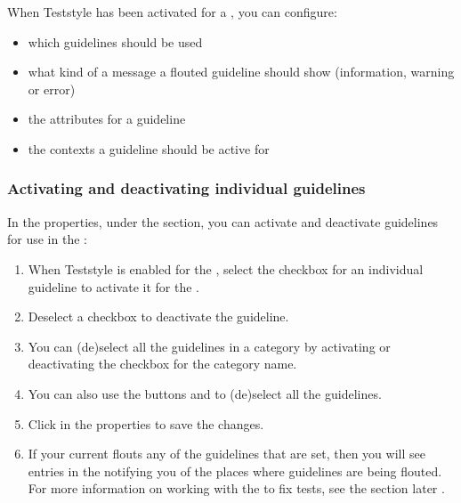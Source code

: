When Teststyle has been activated for a \gdproject{} , you can configure:

\begin{itemize}
\item which guidelines should be used 
\item what kind of a message a flouted guideline should show (information, warning or error) 
\item the attributes for a guideline 
\item the contexts a guideline should be active for 
\end{itemize}

\subsubsection{Activating and deactivating individual guidelines}
\label{TeststyleActivateGuideline}

In the \gdproject{} properties, under the  section, you can activate and deactivate guidelines for use in the \gdproject{}:

\begin{enumerate}
\item When Teststyle is enabled for the \gdproject{} , select the checkbox for an individual guideline to activate it for the \gdproject{}. 
\item Deselect a checkbox to deactivate the guideline. 
\item You can (de)select all the guidelines in a category by activating or deactivating the checkbox for the category name.
\item You can also use the buttons  and  to (de)select all the guidelines. 
\item Click  in the \gdproject{} properties to save the changes.
\item If your current \gdproject{} flouts any of the guidelines that are set, then you will see entries in the \gdprobview{} notifying you of the places where guidelines are being flouted. For more information on working with the \gdprobview{} to fix tests, see the section later .

\end{enumerate}


